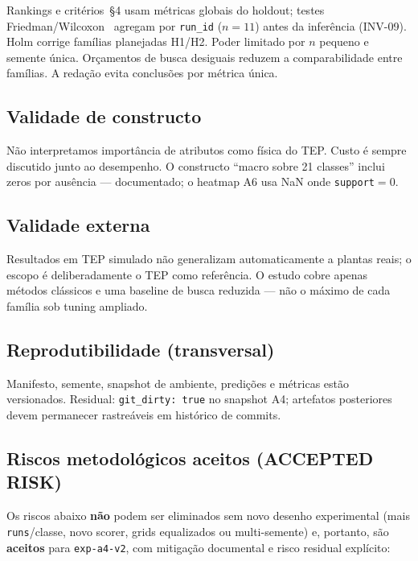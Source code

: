 \documentclass[11pt,a4paper]{article}
\begin{document}
Rankings e critérios~\S4 usam métricas globais do holdout; testes
Friedman/Wilcoxon~\cite{friedman1937,wilcoxon1945} agregam por \texttt{run\_id}
($n{=}11$) antes da inferência (INV-09). Holm corrige famílias planejadas H1/H2.
Poder limitado por $n$ pequeno e semente única. Orçamentos de busca desiguais
reduzem a comparabilidade entre famílias. A redação evita conclusões por métrica
única.

\subsection{Validade de constructo}

Não interpretamos importância de atributos como física do TEP. Custo é sempre
discutido junto ao desempenho. O constructo ``macro sobre 21 classes'' inclui
zeros por ausência --- documentado; o heatmap A6 usa NaN onde
\texttt{support}${=}0$.

\subsection{Validade externa}

Resultados em TEP simulado não generalizam automaticamente a plantas reais; o
escopo é deliberadamente o TEP como referência. O estudo cobre apenas métodos
clássicos e uma baseline de busca reduzida --- não o máximo de cada família sob
tuning ampliado.

\subsection{Reprodutibilidade (transversal)}

Manifesto, semente, snapshot de ambiente, predições e métricas estão
versionados. Residual: \texttt{git\_dirty: true} no snapshot A4; artefatos
posteriores devem permanecer rastreáveis em histórico de commits.

\subsection{Riscos metodológicos aceitos (ACCEPTED RISK)}

Os riscos abaixo \textbf{não} podem ser eliminados sem novo desenho experimental
(mais \texttt{runs}/classe, novo scorer, grids equalizados ou multi-semente) e,
portanto, são \textbf{aceitos} para \texttt{exp-a4-v2}, com mitigação documental
e risco residual explícito:
\end{document}

